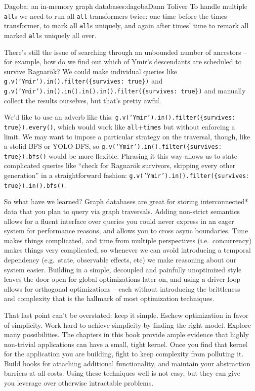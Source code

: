 \begin{aosachapter}{Dagoba: an in-memory graph database}{s:dagoba}{Dann Toliver}
To handle multiple \texttt{all}s we need to run all \texttt{all}
transformers twice: one time before the times transformer, to mark all
\texttt{all}s uniquely, and again after times' time to remark all marked
\texttt{all}s uniquely all over.

There's still the issue of searching through an unbounded number of
ancestors -- for example, how do we find out which of Ymir's descendants
are scheduled to survive Ragnarök? We could make individual queries like
\texttt{g.v('Ymir').in().filter(\{survives: true\})} and
\texttt{g.v('Ymir').in().in().in().in().filter(\{survives: true\})} and
manually collect the results ourselves, but that's pretty awful.

We'd like to use an adverb like this:
\texttt{g.v('Ymir').in().filter(\{survives: true\}).every()}, which
would work like \texttt{all}+\texttt{times} but without enforcing a
limit. We may want to impose a particular strategy on the traversal,
though, like a stolid BFS or YOLO DFS, so
\texttt{g.v('Ymir').in().filter(\{survives: true\}).bfs()} would be more
flexible. Phrasing it this way allows us to state complicated queries
like ``check for Ragnarök survivors, skipping every other generation''
in a straightforward fashion:
\texttt{g.v('Ymir').in().filter(\{survives: true\}).in().bfs()}.

\label{wrapping-up}

So what have we learned? Graph databases are great for storing
interconnected* data that you plan to query via graph traversals. Adding
non-strict semantics allows for a fluent interface over queries you
could never express in an eager system for performance reasons, and
allows you to cross async boundaries. Time makes things complicated, and
time from multiple perspectives (i.e.~concurrency) makes things very
complicated, so whenever we can avoid introducing a temporal dependency
(e.g.~state, observable effects, etc) we make reasoning about our system
easier. Building in a simple, decoupled and painfully unoptimized style
leaves the door open for global optimizations later on, and using a
driver loop allows for orthogonal optimizations -- each without
introducing the brittleness and complexity that is the hallmark of most
optimization techniques.

That last point can't be overstated: keep it simple. Eschew optimization
in favor of simplicity. Work hard to achieve simplicity by finding the
right model. Explore many possibilities. The chapters in this book
provide ample evidence that highly non-trivial applications can have a
small, tight kernel. Once you find that kernel for the application you
are building, fight to keep complexity from polluting it. Build hooks
for attaching additional functionality, and maintain your abstraction
barriers at all costs. Using these techniques well is not easy, but they
can give you leverage over otherwise intractable problems.


\end{aosachapter}

